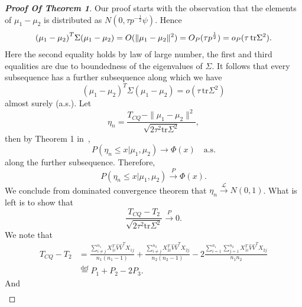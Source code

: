 \documentclass[review]{elsarticle}
\theoremstyle{plain}
\theoremstyle{definition}
\theoremstyle{remark}
\begin{document}
\begin{proof}[\textbf{Proof Of Theorem 1}]
    Our proof starts with the observation that the elements of $\mu_1-\mu_2$ is distributed as $N(0,\tau{p}^{-\frac{1}{2}}\psi)$. Hence 
    \begin{align}
        {(\mu_1-\mu_2)}^T \Sigma (\mu_1-\mu_2)=O(\|\mu_1-\mu_2\|^2)\notag
        =O_P(\tau p^{\frac{1}{2}})\notag
        =o_P(\tau\, \mathrm{tr}\Sigma^2).\notag
    \end{align}
Here the second equality holds by law of large number, the first and third equalities are due to boundedness of the eigenvalues of $\Sigma$.
    It follows that every subsequence has a further subsequence along which we have 
\begin{equation*}
{(\mu_1-\mu_2)}^T \Sigma (\mu_1-\mu_2)=o(\tau\, \mathrm{tr}\Sigma^2)
\end{equation*} 
        almost surely (a.s.). Let
\begin{equation*}
    \eta_n=\frac{T_{CQ}-\|\mu_1-\mu_2\|^2}{\sqrt{2\tau^2 \mathrm{tr}\Sigma^2}},
\end{equation*}
    then by Theorem 1 in~\cite{Chen2010A}, 
\begin{equation*}
    P(\eta_n\leq x | \mu_1,\mu_2)\to \Phi(x) \quad \textrm{a.s.}
\end{equation*}
along the further subsequence. Therefore,
\begin{equation*}
    P(\eta_n\leq x | \mu_1,\mu_2)\xrightarrow{P} \Phi(x).
\end{equation*}
We conclude from dominated convergence theorem that $\eta_n\xrightarrow{\mathcal{L}}N(0,1)$. What is left is to show that 
\begin{equation}\label{toBe0}
    \frac{T_{CQ}-T_2}{\sqrt{2\tau^2 \mathrm{tr}\Sigma^2}} \xrightarrow{P} 0.
\end{equation}
We note that
\begin{equation*}
\begin{aligned}
T_{CQ}-T_2&=
    \frac{\sum_{i\neq j}^{n_1}X_{1i}^T\hat{{V}}\hat{{V}}^T X_{1j}}{n_1(n_1-1)}+\frac{\sum_{i\neq j}^{n_2}X_{2i}^T\hat{{V}}\hat{{V}}^T X_{2j}}{n_2(n_2-1)}
-2\frac{\sum_{i=1}^{n_1}\sum_{j=1}^{n_2}X_{1i}^T\hat{{V}}\hat{{V}}^T X_{2j}}{n_1n_2}
\\
    &\overset{\textrm{def}}{=}P_1+P_2-2P_3.
\end{aligned}
\end{equation*}
And
\begin{equation*}
\begin{aligned}

\end{aligned}
\end{equation*}
\end{proof}
\end{document}
